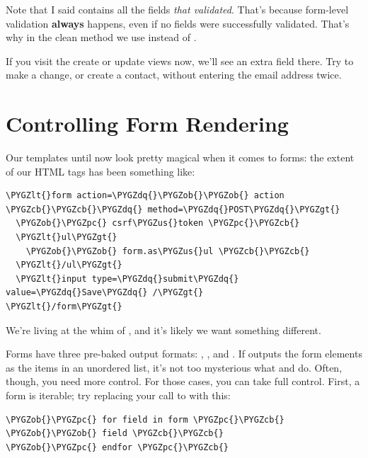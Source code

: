 \documentclass[letterpaper,10pt,english]{sphinxmanual}
\def\PYGZus{\char`\_}
\def\PYGZob{\char`\{}
\def\PYGZcb{\char`\}}
\def\PYGZlt{\char`\<}
\def\PYGZgt{\char`\>}
\def\PYGZpc{\char`\%}
\def\PYGZdq{\char`\"}
\begin{document}
Note that I said  contains all the fields \emph{that
validated}. That's because form-level validation \textbf{always} happens,
even if no fields were successfully validated. That's why in the clean
method we use  instead of
.

If you visit the create or update views now, we'll see an extra field
there. Try to make a change, or create a contact, without entering the
email address twice.


\section{Controlling Form Rendering}
\label{tutorial/forms:controlling-form-rendering}
Our templates until now look pretty magical when it comes to forms:
the extent of our HTML tags has been something like:

\begin{Verbatim}[commandchars=\\\{\}]
\PYGZlt{}form action=\PYGZdq{}\PYGZob{}\PYGZob{} action \PYGZcb{}\PYGZcb{}\PYGZdq{} method=\PYGZdq{}POST\PYGZdq{}\PYGZgt{}
  \PYGZob{}\PYGZpc{} csrf\PYGZus{}token \PYGZpc{}\PYGZcb{}
  \PYGZlt{}ul\PYGZgt{}
    \PYGZob{}\PYGZob{} form.as\PYGZus{}ul \PYGZcb{}\PYGZcb{}
  \PYGZlt{}/ul\PYGZgt{}
  \PYGZlt{}input type=\PYGZdq{}submit\PYGZdq{} value=\PYGZdq{}Save\PYGZdq{} /\PYGZgt{}
\PYGZlt{}/form\PYGZgt{}
\end{Verbatim}

We're living at the whim of , and it's likely we want
something different.

Forms have three pre-baked output formats: , , and
. If  outputs the form elements as the items in
an unordered list, it's not too mysterious what  and
 do.
Often, though, you need more control. For those cases, you can take
full control. First, a form is iterable; try replacing your call to
 with this:

\begin{Verbatim}[commandchars=\\\{\}]
\PYGZob{}\PYGZpc{} for field in form \PYGZpc{}\PYGZcb{}
\PYGZob{}\PYGZob{} field \PYGZcb{}\PYGZcb{}
\PYGZob{}\PYGZpc{} endfor \PYGZpc{}\PYGZcb{}
\end{Verbatim}
\end{document}
